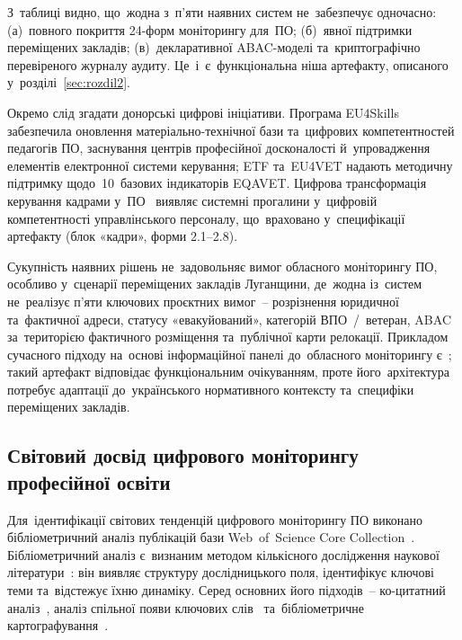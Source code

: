З~таблиці видно, що~жодна з~п'яти наявних систем не~забезпечує одночасно: (а)~повного покриття 24-форм моніторингу для~ПО; (б)~явної підтримки переміщених закладів; (в)~декларативної ABAC-моделі та~криптографічно перевіреного журналу аудиту. Це~і~є~функціональна ніша артефакту, описаного у~розділі~\ref{sec:rozdil2}.

Окремо слід згадати донорські цифрові ініціативи. Програма EU4Skills~\cite{Kulachynskyi2024EU4Skills} забезпечила оновлення матеріально-технічної бази та~цифрових компетентностей педагогів ПО, заснування центрів професійної досконалості й~упровадження елементів електронної системи керування; ETF та~EU4VET надають методичну підтримку щодо~10~базових індикаторів EQAVET. Цифрова трансформація керування кадрами у~ПО~\cite{Zlenko2024DigitalHR} виявляє системні прогалини у~цифровій компетентності управлінського персоналу, що~враховано у~специфікації артефакту (блок «кадри», форми 2.1--2.8).

Сукупність наявних рішень не~задовольняє вимог обласного моніторингу ПО, особливо у~сценарії переміщених закладів Луганщини, де~жодна із~систем не~реалізує п'яти ключових проєктних вимог~-- розрізнення юридичної та~фактичної адреси, статусу «евакуйований», категорій ВПО~/~ветеран, ABAC за~територією фактичного розміщення та~публічної карти релокації. Прикладом сучасного підходу на~основі інформаційної панелі до~обласного моніторингу є~\cite{Mustamir2024Dashboard}; такий артефакт відповідає функціональним очікуванням, проте його~архітектура потребує адаптації до~українського нормативного контексту та~специфіки переміщених закладів.

\subsection{Світовий досвід цифрового моніторингу професійної освіти}
\label{sec:p1-bibliometric}
\label{sec:p1-clusters}
\label{sec:p1-comparison}
\label{sec:p1-llm-naming}
\label{sec:p1-impl-mapping}
\label{sec:p1-impl-displaced}

Для~ідентифікації світових тенденцій цифрового моніторингу ПО виконано бібліометричний аналіз публікацій бази Web~of~Science Core Collection~\cite{Birkle2020}. Бібліометричний аналіз є~визнаним методом кількісного дослідження наукової літератури~\cite{Pritchard1969, Donthu2021, Zupic2015}: він виявляє структуру дослідницького поля, ідентифікує ключові теми та~відстежує їхню динаміку. Серед основних його підходів~-- ко-цитатний аналіз~\cite{Small1973}, аналіз спільної появи ключових слів~\cite{Callon1983} та~бібліометричне картографування~\cite{Cobo2011, Aria2017}.

